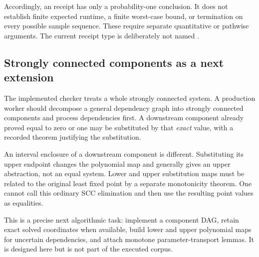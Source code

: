 Accordingly, an  receipt has only a probability-one conclusion. It does not establish finite expected runtime, a finite worst-case bound, or termination on every possible sample sequence. These require separate quantitative or pathwise arguments. The current receipt type is deliberately not named .

\subsection{Strongly connected components as a next extension}
The implemented checker treats a whole strongly connected system. A production worker should decompose a general dependency graph into strongly connected components and process dependencies first. A downstream component already proved equal to zero or one may be substituted by that \emph{exact} value, with a recorded theorem justifying the substitution.

An interval enclosure of a downstream component is different. Substituting its upper endpoint changes the polynomial map and generally gives an upper abstraction, not an equal system. Lower and upper substitution maps must be related to the original least fixed point by a separate monotonicity theorem. One cannot call this ordinary SCC elimination and then use the resulting point values as equalities.

This is a precise next algorithmic task: implement a component DAG, retain exact solved coordinates when available, build lower and upper polynomial maps for uncertain dependencies, and attach monotone parameter-transport lemmas. It is designed here but is not part of the executed corpus.
